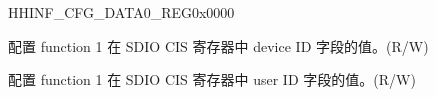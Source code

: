 \begin{register}{H}{HINF\_CFG\_DATA0\_REG}{0x0000}\label{regdesc:HINFCFGDATA0REG}
%
%
\regnewline%
\begin{regdesc}\begin{reglist}
\label{fielddesc:HINFDEVICEIDFN1}\item [HINF\_DEVICE\_ID\_FN1] 配置 function 1 在 SDIO CIS 寄存器中 device ID 字段的值。(R/W)
\label{fielddesc:HINFUSERIDFN1}\item [HINF\_USER\_ID\_FN1] 配置 function 1 在 SDIO CIS 寄存器中 user ID 字段的值。(R/W)
\end{reglist}\end{regdesc}
\end{register}


